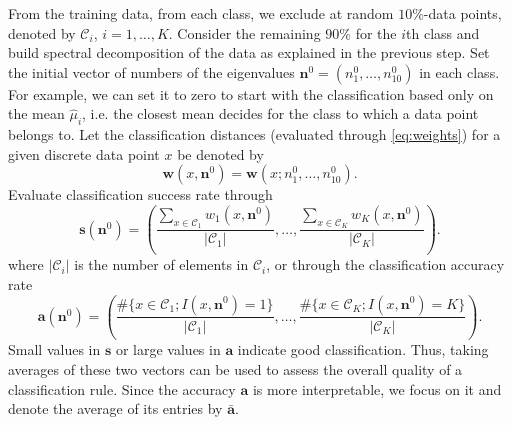 \begin{enumerate}[leftmargin=0.2cm]
From the training data, from each class, we exclude at random $10\%$-data points, denoted by $\mathcal C_i$, $i=1,\dots,K$. 
Consider the remaining $90\%$ for the $i$th class and build spectral decomposition of the data as explained in the previous step.
Set the initial vector of numbers of the eigenvalues $\mathbf n^0=(n^0_1,\dots,n_{10}^0)$ in each class. For example, we can set it to zero to start with the classification based only on the mean $\hat \mu_i$, i.e. the closest mean decides for the class to which a data point belongs to. 
Let the classification distances (evaluated through \eqref{eq:weights}) for a given discrete data point $x$ be denoted by 
$$
\mathbf w(x,{\mathbf n^0})=\mathbf w(x;n^0_1,\dots,n_{10}^0).
$$
Evaluate classification success rate through
$$
\mathbf s({\mathbf n^0})=\left(\frac{\sum_{x\in \mathcal C_1} w_1(x,\mathbf n^0)}{|\mathcal C_1|},\dots,\frac{\sum_{x\in \mathcal C_K} w_K(x,\mathbf n^0)}{|\mathcal C_K|} \right).
$$
where $|\mathcal C_i|$ is the number of elements in $\mathcal C_i$, or through the classification accuracy rate
$$
\mathbf a({\mathbf n^0})=\left(\frac{\#\{x\in \mathcal C_1; I(x,\mathbf n^0)=1\}}{|\mathcal C_1|} ,\dots,\frac{\#\{x\in \mathcal C_K; I(x,\mathbf n^0)=K\}}{|\mathcal C_K|} \right).
$$
Small values in $\mathbf s$ or large values in $\mathbf a$ indicate good classification. 
Thus, taking averages of these two vectors can be used to assess the overall quality of a classification rule. 
Since the accuracy $\mathbf a$ is more interpretable, we focus on it and denote the average of its entries by $\bar {\mathbf a}$. 


\end{enumerate}
